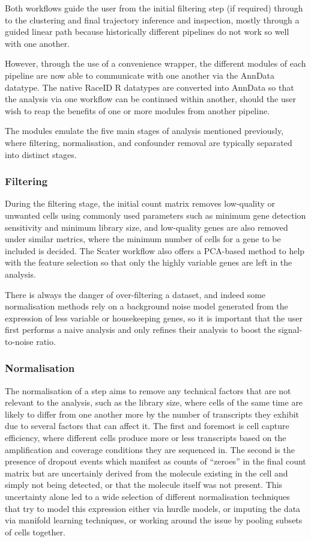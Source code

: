 \documentclass[a4paper,num-refs]{oup-contemporary}
\begin{document}
Both workflows guide the user from the initial filtering step (if required) through to the clustering and final trajectory inference and inspection, mostly through a guided linear path because historically different pipelines do not work so well with one another.

However, through the use of a convenience wrapper, the different modules of each pipeline are now able to communicate with one another via the AnnData datatype. The native RaceID R datatypes are converted into AnnData so that the analysis via one workflow can be continued within another, should the user wish to reap the benefits of one or more modules from another pipeline.

The modules emulate the five main stages of analysis mentioned previously, where filtering, normalisation, and confounder removal are typically separated into distinct stages.

\subsubsection{Filtering}

During the filtering stage, the initial count matrix removes low-quality or unwanted cells using commonly used parameters such as minimum gene detection sensitivity and minimum library size, and low-quality genes are also removed under similar metrics, where the minimum number of cells for a gene to be included is decided. The Scater workflow also offers a PCA-based method to help with the feature selection so that only the highly variable genes are left in the analysis.

There is always the danger of over-filtering a dataset, and indeed some normalisation methods rely on a background noise model generated from the expression of less variable or housekeeping genes, so it is important that the user first performs a naive analysis and only refines their analysis to boost the signal-to-noise ratio.

\subsubsection{Normalisation}
The normalisation of a step aims to remove any technical factors that are not relevant to the analysis, such as the library size, where cells of the same time are likely to differ from one another more by the number of transcripts they exhibit due to several factors that can affect it. The first and foremost is cell capture efficiency, where different cells produce more or less transcripts based on the amplification and coverage conditions they are sequenced in. The second is the presence of dropout events which manifest as counts of ``zeroes'' in the final count matrix but are uncertainly derived from the molecule existing in the cell and simply not being detected, or that the molecule itself was not present. This uncertainty alone led to a wide selection of different normalisation techniques that try to model this expression either via hurdle models, or imputing the data via manifold learning techniques, or working around the issue by pooling subsets of cells together.
\end{document}
